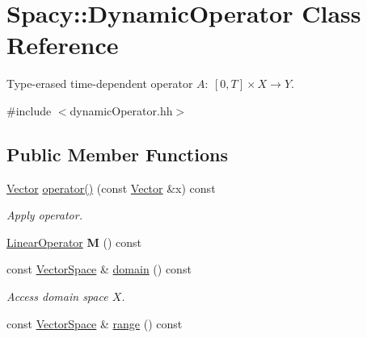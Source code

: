\hypertarget{classSpacy_1_1DynamicOperator}{}\section{Spacy\+:\+:Dynamic\+Operator Class Reference}
\label{classSpacy_1_1DynamicOperator}


Type-\/erased time-\/dependent operator $A:\ [0,T] \times X \to Y $.  




{\ttfamily \#include $<$dynamic\+Operator.\+hh$>$}

\subsection*{Public Member Functions}
\begin{DoxyCompactItemize}
\item 
\hyperlink{classSpacy_1_1Vector}{Vector} \hyperlink{classSpacy_1_1DynamicOperator_ace2c2202ca6eb3fe5f5817087d30510a}{operator()} (const \hyperlink{classSpacy_1_1Vector}{Vector} \&x) const \hypertarget{classSpacy_1_1DynamicOperator_ace2c2202ca6eb3fe5f5817087d30510a}{}\label{classSpacy_1_1DynamicOperator_ace2c2202ca6eb3fe5f5817087d30510a}

\begin{DoxyCompactList}\small\item\em Apply operator. \end{DoxyCompactList}\item 
\hyperlink{classSpacy_1_1LinearOperator}{Linear\+Operator} {\bfseries M} () const \hypertarget{classSpacy_1_1DynamicOperator_a38c8c5337fd79a98a7e64139d0cbed38}{}\label{classSpacy_1_1DynamicOperator_a38c8c5337fd79a98a7e64139d0cbed38}

\item 
const \hyperlink{classSpacy_1_1VectorSpace}{Vector\+Space} \& \hyperlink{classSpacy_1_1DynamicOperator_ad457cb5571c721f97530895aa26af626}{domain} () const \hypertarget{classSpacy_1_1DynamicOperator_ad457cb5571c721f97530895aa26af626}{}\label{classSpacy_1_1DynamicOperator_ad457cb5571c721f97530895aa26af626}

\begin{DoxyCompactList}\small\item\em Access domain space $X$. \end{DoxyCompactList}\item 
const \hyperlink{classSpacy_1_1VectorSpace}{Vector\+Space} \& \hyperlink{classSpacy_1_1DynamicOperator_ab760994d921fa8d9df2882f9e4cfc9c3}{range} () const \hypertarget{classSpacy_1_1DynamicOperator_ab760994d921fa8d9df2882f9e4cfc9c3}{}\label{classSpacy_1_1DynamicOperator_ab760994d921fa8d9df2882f9e4cfc9c3}


\end{DoxyCompactItemize}
